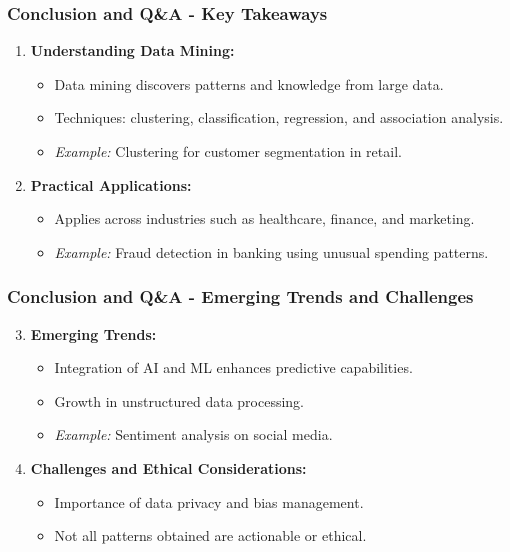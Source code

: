 \documentclass[aspectratio=169]{beamer}
\begin{document}
\begin{frame}[fragile]
    \frametitle{Conclusion and Q\&A - Key Takeaways}
    \begin{enumerate}
        \item \textbf{Understanding Data Mining:}
        \begin{itemize}
            \item Data mining discovers patterns and knowledge from large data.
            \item Techniques: clustering, classification, regression, and association analysis.
            \item \textit{Example:} Clustering for customer segmentation in retail.
        \end{itemize}
        
        \item \textbf{Practical Applications:}
        \begin{itemize}
            \item Applies across industries such as healthcare, finance, and marketing.
            \item \textit{Example:} Fraud detection in banking using unusual spending patterns.
        \end{itemize}
    \end{enumerate}
\end{frame}

\begin{frame}[fragile]
    \frametitle{Conclusion and Q\&A - Emerging Trends and Challenges}
    \begin{enumerate}
        \setcounter{enumi}{2} %
        \item \textbf{Emerging Trends:}
        \begin{itemize}
            \item Integration of AI and ML enhances predictive capabilities.
            \item Growth in unstructured data processing.
            \item \textit{Example:} Sentiment analysis on social media.
        \end{itemize}
        
        \item \textbf{Challenges and Ethical Considerations:}
        \begin{itemize}
            \item Importance of data privacy and bias management.
            \item Not all patterns obtained are actionable or ethical.
        \end{itemize}
    \end{enumerate}
\end{frame}
\end{document}
